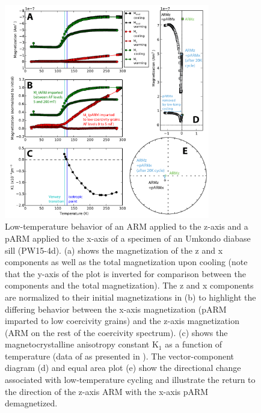 \documentclass[draft,gc]{AGUTeX}
\begin{document}
\begin{figure}
\noindent\includegraphics[width=0.8\textwidth]{PW15-4d_ARMex.pdf}
\caption{Low-temperature behavior of an ARM applied to the z-axis and a pARM applied to the x-axis of a specimen of an Umkondo diabase sill (PW15-4d). (a) shows the magnetization of the z and x components as well as the total magnetization upon cooling (note that the y-axis of the plot is inverted for comparison between the components and the total magnetization). The z and x components are normalized to their initial magnetizations in (b) to highlight the differing behavior between the x-axis magnetization (pARM imparted to low coercivity grains) and the z-axis magnetization (ARM on the rest of the coercivity spectrum). (c) shows the magnetocrystalline anisotropy constant K$_1$ as a function of temperature (data of \cite{Bickford1957a} as presented in \cite{Muxworthy2000b}). The vector-component diagram (d) and equal area plot (e) show the directional change associated with low-temperature cycling and illustrate the return to the direction of the z-axis ARM with the x-axis pARM demagnetized.}
\label{fig:Umkondo_ARM}
\end{figure}
\end{document}
